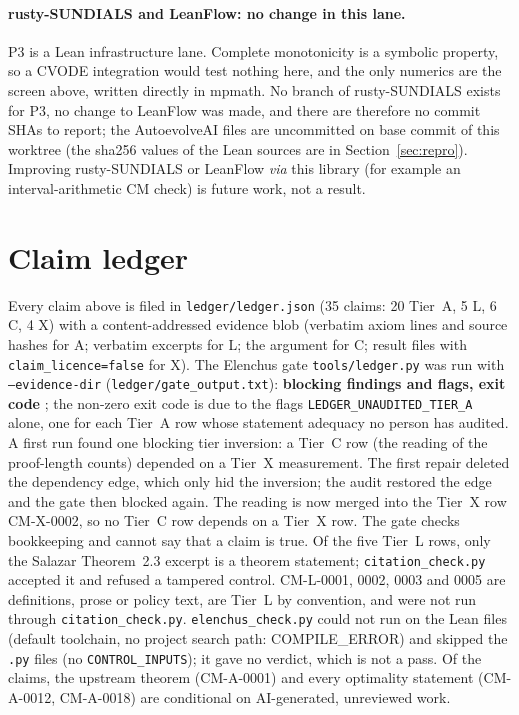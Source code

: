 \documentclass[10pt]{article}
\theoremstyle{remark}
\begin{document}
\paragraph{rusty-SUNDIALS and LeanFlow: no change in this lane.} P3 is a Lean infrastructure lane. Complete monotonicity is a
symbolic property, so a CVODE integration would test nothing here, and the only numerics are the screen above, written
directly in mpmath. No branch of rusty-SUNDIALS exists for P3, no change to LeanFlow was made, and there are therefore no
commit SHAs to report; the AutoevolveAI files are uncommitted on base commit \texttt{\PnBaseShort} of this
worktree (the sha256 values of the Lean sources are in Section~\ref{sec:repro}). Improving rusty-SUNDIALS or LeanFlow
\emph{via} this library (for example an interval-arithmetic CM check) is future work, not a result.

\section{Claim ledger}\label{sec:ledger}
Every claim above is filed in \texttt{ledger/ledger.json} (35 claims: 20 Tier~A, 5 L, 6 C, 4 X) with a content-addressed
evidence blob (verbatim axiom lines and source hashes for A; verbatim excerpts for L; the argument for C; result files with
\texttt{claim\_licence=false} for X). The Elenchus gate \texttt{tools/ledger.py} was run with \texttt{--evidence-dir}
(\texttt{ledger/gate\_output.txt}): \textbf{\PnGateBlock{} blocking findings and \PnGateFlags{} flags, exit code \PnGateExit}; the non-zero exit
code is due to the flags \texttt{LEDGER\_UNAUDITED\_TIER\_A} alone, one for each Tier~A row whose statement adequacy no person has
audited. A first run found one blocking tier inversion: a Tier~C row (the reading of the proof-length counts) depended on a Tier~X measurement. The first repair deleted the dependency edge, which only hid the inversion; the audit restored the edge and the gate then blocked again. The reading is now merged into the Tier~X row CM-X-0002, so no Tier~C row depends on a Tier~X row. The gate checks bookkeeping and cannot say that a claim is true. Of the five Tier~L rows, only the Salazar Theorem~2.3 excerpt is a theorem statement; \texttt{citation\_check.py} accepted it and refused a tampered control. CM-L-0001, 0002, 0003 and 0005 are definitions, prose or policy text, are Tier~L by convention, and were not run through \texttt{citation\_check.py}. \texttt{elenchus\_check.py} could not run on the Lean files (default toolchain, no project search path: COMPILE\_ERROR) and skipped the \texttt{.py} files (no \texttt{CONTROL\_INPUTS}); it gave no verdict, which is not a pass. Of the claims, the
upstream theorem (CM-A-0001) and every optimality statement (CM-A-0012, CM-A-0018) are conditional on AI-generated, unreviewed
work.
\end{document}
